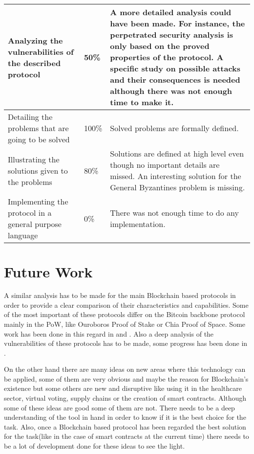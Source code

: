 \documentclass[..]{subfiles}
\begin{document}
\begin{centering}
\begin{longtable}{|m{}<{\centering}|m{}<{\centering}|m{}<{\centering}|}
		\hline
		Analyzing the vulnerabilities of the described protocol & 50\% & A more detailed analysis could have been made. For instance, the perpetrated security analysis is only based on the proved properties of the protocol. A specific study on possible attacks and their consequences is needed although there was not enough time to make it.\\
		\hline
		Detailing the problems that are going to be solved & 100\% & Solved problems are formally defined.\\
		\hline
		Illustrating the solutions given to the problems & 80\% & Solutions are defined at high level even though no important details are missed. An interesting solution for the General Byzantines problem is missing.\\
		\hline
		Implementing the protocol in a general purpose language & 0\% & There was not enough time to do any implementation.\\
		\hline
	\end{longtable}
\end{centering}


\section{Future Work}

A similar analysis has to be made for the main Blockchain based protocols in order to provide a clear comparison of their characteristics and capabilities. Some of the most important of these protocols differ on the Bitcoin backbone protocol mainly in the PoW, like Ouroboros Proof of Stake or Chia Proof of Space. Some work has been done in this regard in \cite{ren2019analysis} and \cite{kiayias2020pos}. Also a deep analysis of the vulnerabilities of these protocols has to be made, some progress has been done in \cite{dembo2020everything}.

On the other hand there are many ideas on new areas where this technology can be applied, some of them are very obvious and maybe the reason for Blockchain's existence but some others are new and disruptive like using it in the healthcare sector, virtual voting, supply chains or the creation of smart contracts. Although some of these ideas are good some of them are not. There needs to be a deep understanding of the tool in hand in order to know if it is the best choice for the task. Also, once a Blockchain based protocol has been regarded the best solution for the task(like in the case of smart contracts at the current time) there needs to be a lot of development done for these ideas to see the light.
\end{document}
